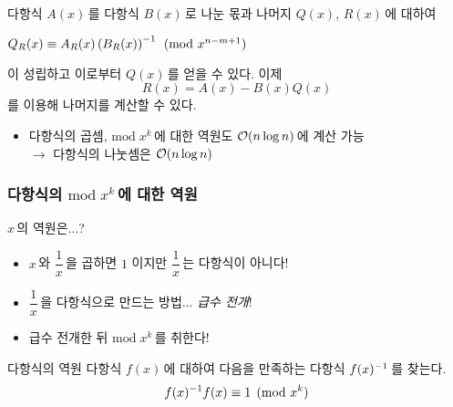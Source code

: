 \begin{frame}
    \begin{theorem}
        다항식 \(A(x)\)\,를 다항식 \(B(x)\)\,로 나눈 몫과 나머지 \(Q(x)\), \(R(x)\)\,에 대하여
        \begin{center}
            \(Q_R(x) \equiv A_R(x)\left(B_R(x)\right)^{-1} \pmod{x^{n - m + 1}}\)
        \end{center}
        이 성립하고 이로부터 \(Q(x)\)\,를 얻을 수 있다. \pause 이제
        \[
            R(x) = A(x) - B(x)Q(x)
        \]
        를 이용해 나머지를 계산할 수 있다.
    \end{theorem}

    \pause

    \begin{itemize}
        \item 다항식의 곱셈, \(\mathrm{mod}\;x^k\)\,에 대한 역원도 \(\mathcal{O}(n\log n)\)\,에 계산 가능 \pause \\
              \(\rightarrow\) \alert{다항식의 나눗셈은 \(\mathcal{O}(n\log n)\)}
    \end{itemize}
\end{frame}

\begin{frame}
    \frametitle{다항식의 \(\mathrm{mod}\;x^k\)\,에 대한 역원}
    \(x\)\,의 역원은...? \pause
    \medskip
    \begin{itemize}
        \setlength{\itemsep}{0.8em}
        \item \(x\)\,와 \(\dfrac{1}{x}\)\,을 곱하면 \(1\) 이지만 \(\dfrac{1}{x}\)\,는 \alert{다항식이 아니다!} \pause
        \item \(\dfrac{1}{x}\)\,을 다항식으로 만드는 방법... \textit{급수 전개}! \pause
        \item<4-> 급수 전개한 뒤 \(\mathrm{mod}\;x^k\)\,를 취한다!
    \end{itemize}

    \pause

    \begin{block}{다항식의 역원}
        다항식 \(f(x)\)\,에 대하여 다음을 만족하는 다항식 \(f(x)^{-1}\)\,를 찾는다.
        \vspace*{-5px}
        \[
            f(x)^{-1} f(x) \equiv 1 \pmod{x^k}
        \] \vspace*{-15px}
    \end{block}
\end{frame}

